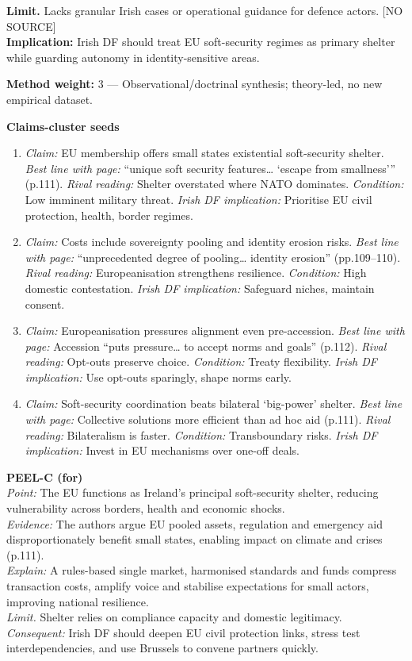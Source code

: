 \textbf{Limit.} Lacks granular Irish cases or operational guidance for defence actors. [NO SOURCE]\\
\textbf{Implication:} Irish DF should treat EU soft-security regimes as primary shelter while guarding autonomy in identity-sensitive areas.

\textbf{Method weight:} 3 — Observational/doctrinal synthesis; theory-led, no new empirical dataset.

\textbf{Claims-cluster seeds}
\begin{enumerate}
	\item \textit{Claim:} EU membership offers small states existential soft-security shelter. \textit{Best line with page:} “unique soft security features… ‘escape from smallness’” (p.111). \textit{Rival reading:} Shelter overstated where NATO dominates. \textit{Condition:} Low imminent military threat. \textit{Irish DF implication:} Prioritise EU civil protection, health, border regimes.
	\item \textit{Claim:} Costs include sovereignty pooling and identity erosion risks. \textit{Best line with page:} “unprecedented degree of pooling… identity erosion” (pp.109–110). \textit{Rival reading:} Europeanisation strengthens resilience. \textit{Condition:} High domestic contestation. \textit{Irish DF implication:} Safeguard niches, maintain consent.
	\item \textit{Claim:} Europeanisation pressures alignment even pre-accession. \textit{Best line with page:} Accession “puts pressure… to accept norms and goals” (p.112). \textit{Rival reading:} Opt-outs preserve choice. \textit{Condition:} Treaty flexibility. \textit{Irish DF implication:} Use opt-outs sparingly, shape norms early.
	\item \textit{Claim:} Soft-security coordination beats bilateral ‘big-power’ shelter. \textit{Best line with page:} Collective solutions more efficient than ad hoc aid (p.111). \textit{Rival reading:} Bilateralism is faster. \textit{Condition:} Transboundary risks. \textit{Irish DF implication:} Invest in EU mechanisms over one-off deals.
\end{enumerate}

\textbf{PEEL-C (for)}\\
\textit{Point:} The EU functions as Ireland’s principal soft-security shelter, reducing vulnerability across borders, health and economic shocks.\\
\textit{Evidence:} The authors argue EU pooled assets, regulation and emergency aid disproportionately benefit small states, enabling impact on climate and crises (p.111).\\ 
\textit{Explain:} A rules-based single market, harmonised standards and funds compress transaction costs, amplify voice and stabilise expectations for small actors, improving national resilience.\\
\textit{Limit.} Shelter relies on compliance capacity and domestic legitimacy.\\
\textit{Consequent:} Irish DF should deepen EU civil protection links, stress test interdependencies, and use Brussels to convene partners quickly.

